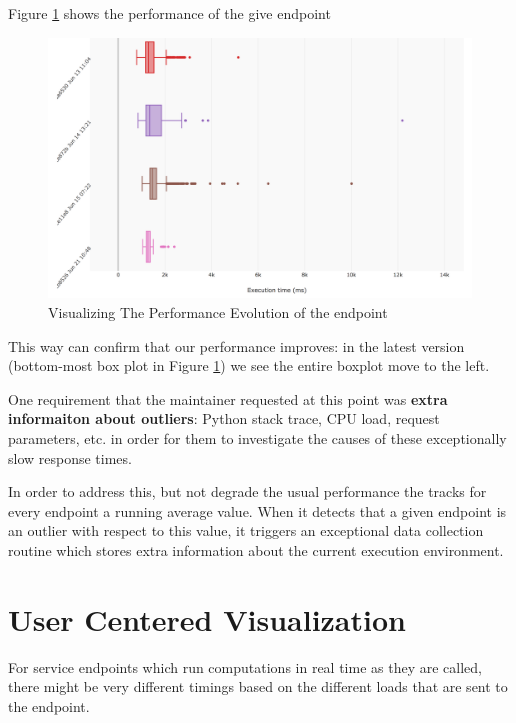 \documentclass[conference]{IEEEtran}
\begin{document}
  Figure \ref{fig:tee} shows the performance of the give endpoint 

  \begin{figure}[h!]
    \centering
    \includegraphics[width=\linewidth]{translation_endpoint_evolution.png}
    \caption{Visualizing The Performance Evolution of the \epTranslations endpoint}
    \label{fig:tee}
  \end{figure}

  This way can confirm that our performance improves: in the latest version (bottom-most box plot in Figure \ref{fig:tee}) we see the entire boxplot move to the left. 


  \niceseparator


  One requirement that the maintainer requested at this point was {\bf extra informaiton about outliers}: Python stack trace, CPU load, request parameters, etc. in order for them to investigate the causes of these exceptionally slow response times. 

  In order to address this, but not degrade the usual performance the \tool tracks for every endpoint a running average value. When it detects that a given endpoint is an outlier with respect to this value, it triggers an exceptional data collection routine which stores extra information about the current execution environment. 


\section {User Centered Visualization}

  For service endpoints which run computations in real time as they are called, there might be very different timings based on the different loads that are sent to the endpoint. 
\end{document}
